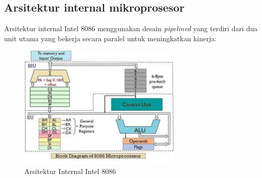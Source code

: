 \subsection{Arsitektur internal mikroprosesor}
Arsitektur internal Intel 8086 menggunakan desain \textit{pipelined} yang terdiri dari dua unit utama yang bekerja secara paralel untuk meningkatkan kinerja:

\begin{figure}[h]
  \centering
  \includegraphics[width=0.7\textwidth]{8086_architecture.jpg}
  \caption{Arsitektur Internal Intel 8086}
  \label{fig:8086-architecture}
  \end{figure}

